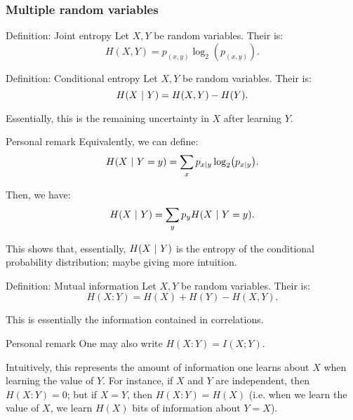 \documentclass[a4paper]{article}
\begin{document}
\subsubsection{Multiple random variables}

\begin{parag}{Definition: Joint entropy}
    Let $X, Y$ be random variables. Their  is: 
    \[H\left(X, Y\right) = p_{\left(x, y\right)} \log_{2}\left(p_{\left(x, y\right)}\right).\]
\end{parag}

\begin{parag}{Definition: Conditional entropy}
    Let $X, Y$ be random variables. Their  is: 
    \[H\left(X \suchthat Y\right) = H\left(X, Y\right) - H\left(Y\right).\]

    Essentially, this is the remaining uncertainty in $X$ after learning $Y$.

    \begin{subparag}{Personal remark}
        Equivalently, we can define: 
        \[H\left(X \suchthat Y = y\right) = \sum_{x} p_{x | y} \log_{2}\left(p_{x|y }\right).\]
        
        Then, we have: 
        \[H\left(X \suchthat Y\right) = \sum_{y} p_y H\left(X \suchthat Y = y\right).\]

        This shows that, essentially, $H\left(X \suchthat Y\right)$ is the entropy of the conditional probability distribution; maybe giving more intuition.
    \end{subparag}
\end{parag}

\begin{parag}{Definition: Mutual information}
    Let $X, Y$ be random variables. Their  is: 
    \[H\left(X : Y\right) = H\left(X\right) + H\left(Y\right) - H\left(X, Y\right).\]

    This is essentially the information contained in correlations.

    \begin{subparag}{Personal remark}
        One may also write $H\left(X: Y\right) = I\left(X; Y\right)$.

        Intuitively, this represents the amount of information one learns about $X$ when learning the value of $Y$. For instance, if $X$ and $Y$ are independent, then $H\left(X: Y\right) = 0$; but if $X = Y$, then $H\left(X: Y\right) = H\left(X\right)$ (i.e. when we learn the value of $X$, we learn $H\left(X\right)$ bits of information about $Y = X$).
    \end{subparag}
\end{parag}
\end{document}
